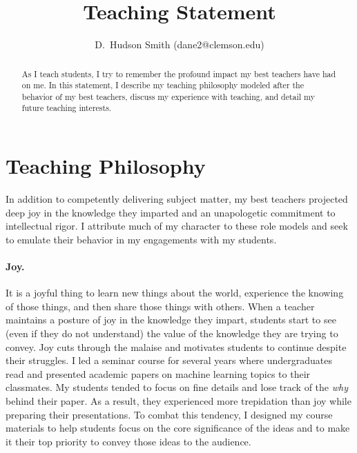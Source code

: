\documentclass[nobib]{tufte-handout}
\title{Teaching Statement}
\author{D.~Hudson Smith (dane2@clemson.edu)}
\begin{document}
\maketitle%

\begin{abstract}
  \noindent As I teach students, I try to remember the profound impact my best teachers have had on me. In this statement, I describe my teaching philosophy modeled after the behavior of my best teachers, discuss my experience with teaching, and detail my future teaching interests.
\end{abstract}

{}


\section{Teaching Philosophy}
In addition to competently delivering subject matter, my best teachers projected deep joy in the knowledge they imparted and an unapologetic commitment to intellectual rigor. I attribute much of my character to these role models and seek to emulate their behavior in my engagements with my students.

\paragraph{Joy.} It is a joyful thing to learn new things about the world, experience the knowing of those things, and then share those things with others. When a teacher maintains a posture of joy in the knowledge they impart, students start to see (even if they do not understand) the value of the knowledge they are trying to convey. Joy cuts through the malaise and motivates students to continue despite their struggles. I led a seminar course for several years where undergraduates read and presented academic papers on machine learning topics to their classmates. My students tended to focus on fine details and lose track of the {\it why} behind their paper. As a result, they experienced more trepidation than joy while preparing their presentations. To combat this tendency, I designed my course materials to help students focus on the core significance of the ideas and to make it their top priority to convey those ideas to the audience.
\end{document}
